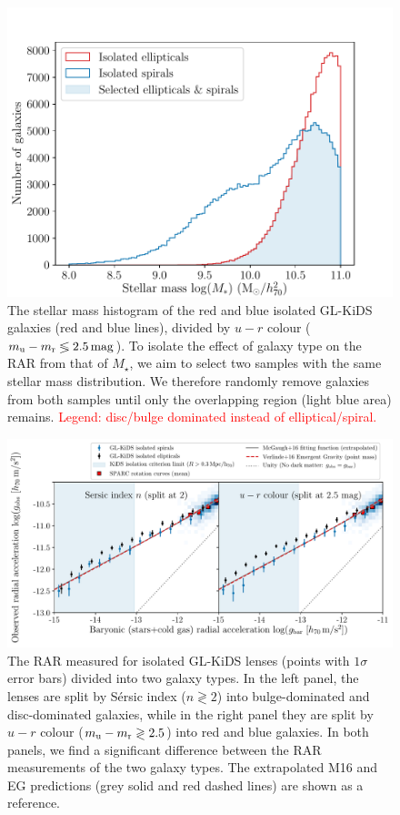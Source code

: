 \documentclass[usenatbib]{mnras}
\newcommand{\magn}{\, {\rm mag} }
\newcommand{\un}[1]{_{\rm #1}}
\begin{document}
\begin{figure}
	\includegraphics[width=\columnwidth]{Figures/mass_range_selection_offsetx0.pdf}
	\caption{The stellar mass histogram of the red and blue isolated GL-KiDS galaxies (red and blue lines), divided by $u-r$ colour ($m\un{u} - m\un{r} \lessgtr 2.5 \magn$). To isolate the effect of galaxy type on the RAR from that of $M_\star$, we aim to select two samples with the same stellar mass distribution. We therefore randomly remove galaxies from both samples until only the overlapping region (light blue area) remains. \textcolor{red}{Legend: disc/bulge dominated instead of elliptical/spiral.}}
	\label{fig:galtypes_masshist}
\end{figure}


\begin{figure}
	\includegraphics[width=\textwidth]{Figures/RAR_KiDS_galtypes_isolated_samemass.pdf}
	\caption{The RAR measured for isolated GL-KiDS lenses (points with $1\sigma$ error bars) divided into two galaxy types. In the left panel, the lenses are split by S\'ersic index ($n\gtrless2$) into bulge-dominated and disc-dominated galaxies, while in the right panel they are split by $u-r$ colour ($m\un{u} - m\un{r} \gtrless 2.5$) into red and blue galaxies. In both panels, we find a significant difference between the RAR measurements of the two galaxy types. The extrapolated M16 and EG predictions (grey solid and red dashed lines) are shown as a reference.}
	\label{fig:RAR_kids_galtypebins}
\end{figure}
\end{document}

